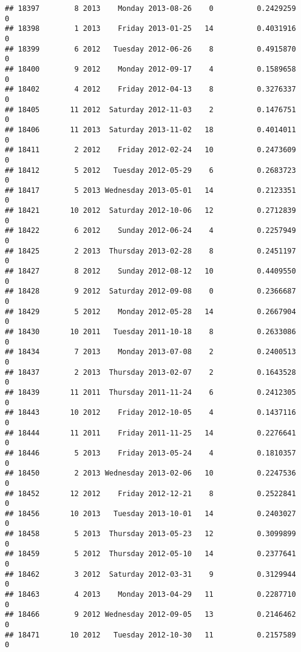 \documentclass[
]{article}
\begin{document}
\begin{verbatim}
## 18397        8 2013    Monday 2013-08-26    0          0.2429259             0
## 18398        1 2013    Friday 2013-01-25   14          0.4031916             0
## 18399        6 2012   Tuesday 2012-06-26    8          0.4915870             0
## 18400        9 2012    Monday 2012-09-17    4          0.1589658             0
## 18402        4 2012    Friday 2012-04-13    8          0.3276337             0
## 18405       11 2012  Saturday 2012-11-03    2          0.1476751             0
## 18406       11 2013  Saturday 2013-11-02   18          0.4014011             0
## 18411        2 2012    Friday 2012-02-24   10          0.2473609             0
## 18412        5 2012   Tuesday 2012-05-29    6          0.2683723             0
## 18417        5 2013 Wednesday 2013-05-01   14          0.2123351             0
## 18421       10 2012  Saturday 2012-10-06   12          0.2712839             0
## 18422        6 2012    Sunday 2012-06-24    4          0.2257949             0
## 18425        2 2013  Thursday 2013-02-28    8          0.2451197             0
## 18427        8 2012    Sunday 2012-08-12   10          0.4409550             0
## 18428        9 2012  Saturday 2012-09-08    0          0.2366687             0
## 18429        5 2012    Monday 2012-05-28   14          0.2667904             0
## 18430       10 2011   Tuesday 2011-10-18    8          0.2633086             0
## 18434        7 2013    Monday 2013-07-08    2          0.2400513             0
## 18437        2 2013  Thursday 2013-02-07    2          0.1643528             0
## 18439       11 2011  Thursday 2011-11-24    6          0.2412305             0
## 18443       10 2012    Friday 2012-10-05    4          0.1437116             0
## 18444       11 2011    Friday 2011-11-25   14          0.2276641             0
## 18446        5 2013    Friday 2013-05-24    4          0.1810357             0
## 18450        2 2013 Wednesday 2013-02-06   10          0.2247536             0
## 18452       12 2012    Friday 2012-12-21    8          0.2522841             0
## 18456       10 2013   Tuesday 2013-10-01   14          0.2403027             0
## 18458        5 2013  Thursday 2013-05-23   12          0.3099899             0
## 18459        5 2012  Thursday 2012-05-10   14          0.2377641             0
## 18462        3 2012  Saturday 2012-03-31    9          0.3129944             0
## 18463        4 2013    Monday 2013-04-29   11          0.2287710             0
## 18466        9 2012 Wednesday 2012-09-05   13          0.2146462             0
## 18471       10 2012   Tuesday 2012-10-30   11          0.2157589             0

\end{verbatim}
\end{document}
